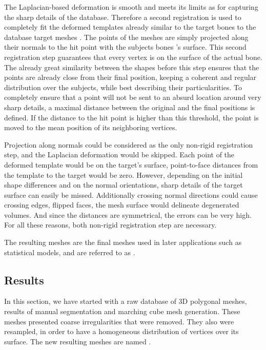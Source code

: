 The Laplacian-based deformation is smooth and meets its limits as for capturing the sharp details of the database. Therefore a second registration is used to completely fit the deformed templates \ml* already similar to the target bones to the database target meshes \mr*. The points of the \ml* meshes are simply projected along their normals to the hit point with the subjects bones \mr*'s surface. This second registration step guarantees that every vertex is on the surface of the actual bone. The already great similarity between the shapes before this step ensures that the points are already close from their final position, keeping a coherent and regular distribution over the subjects, while best describing their particularities. To completely ensure that a point will not be sent to an absurd location around very sharp details, a maximal distance between the original and the final positions is defined. If the distance to the hit point is higher than this threshold, the point is moved to the mean position of its neighboring vertices. 

Projection along normals could be considered as the only non-rigid registration step, and the Laplacian deformation would be skipped. Each point of the deformed template would be on the target's surface, point-to-face distances from the template to the target would be zero. However, depending on the initial shape differences and on the normal orientations, sharp details of the target surface can easily be missed. Additionally crossing normal directions could cause crossing edges, flipped faces, the mesh surface would delineate degenerated volumes. %
And since the distances are symmetrical, the errors can be very high. For all these reasons, both non-rigid registration step are necessary.


The resulting meshes are the final meshes used in later applications such as statistical models, and are referred to as \mw*. 



\subsection{Results}

In this section, we have started with a raw database of 3D polygonal meshes, results of manual segmentation and marching cube mesh generation. These meshes presented coarse irregularities that were removed. They also were resampled, in order to have a homogeneous distribution of vertices over its surface. The new resulting meshes are named \md*.

